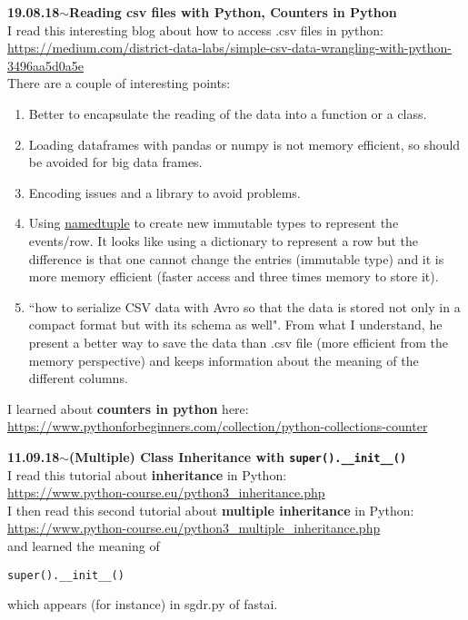 \documentclass[11pt,a4paper]{article}
\newenvironment{loggentry}[2]%
{\noindent\textbf{#1}\hspace{1cm}$\mathbf{\sim}$\text{ }\textbf{#2}\\}{\vspace{0.5cm}}
\begin{document}
\begin{loggentry}{19.08.18}{Reading csv files with Python, Counters in Python}
I read this interesting blog about how to access .csv files in python:\\
\url{https://medium.com/district-data-labs/simple-csv-data-wrangling-with-python-3496aa5d0a5e}\\
There are a couple of interesting points:\\
\begin{enumerate}
\item Better to encapsulate the reading of the data into a function or a class.
\item Loading dataframes with pandas or numpy is not memory efficient, so should be avoided for big data frames.
\item Encoding issues and a library to avoid problems.
\item Using \href{https://docs.python.org/3/library/collections.html#collections.namedtuple}{namedtuple} to create new immutable types to represent the events/row. It looks like using a dictionary to represent a row but the difference is that one cannot change the entries (immutable type) and it is more memory efficient (faster access and three times memory to store it).
\item ``how to serialize CSV data with Avro so that the data is stored not only in a compact format but with its schema as well". From what I understand, he present a better way to save the data than .csv file (more efficient from the memory perspective) and keeps information about the meaning of the different columns.
\end{enumerate}

I learned about \textbf{counters in python} here:\\
\url{https://www.pythonforbeginners.com/collection/python-collections-counter}\\

\end{loggentry}

\begin{loggentry}{11.09.18}{(Multiple) Class Inheritance with \texttt{super().\_\_init\_\_()}}
I read this tutorial about \textbf{inheritance} in Python:\\
\url{https://www.python-course.eu/python3_inheritance.php}\\
I then read this second tutorial about \textbf{multiple inheritance} in Python:\\
\url{https://www.python-course.eu/python3_multiple_inheritance.php}\\
and learned the meaning of 
\begin{verbatim}
super().__init__()
\end{verbatim}
which appears (for instance) in sgdr.py of fastai.
\end{loggentry}
\end{document}
